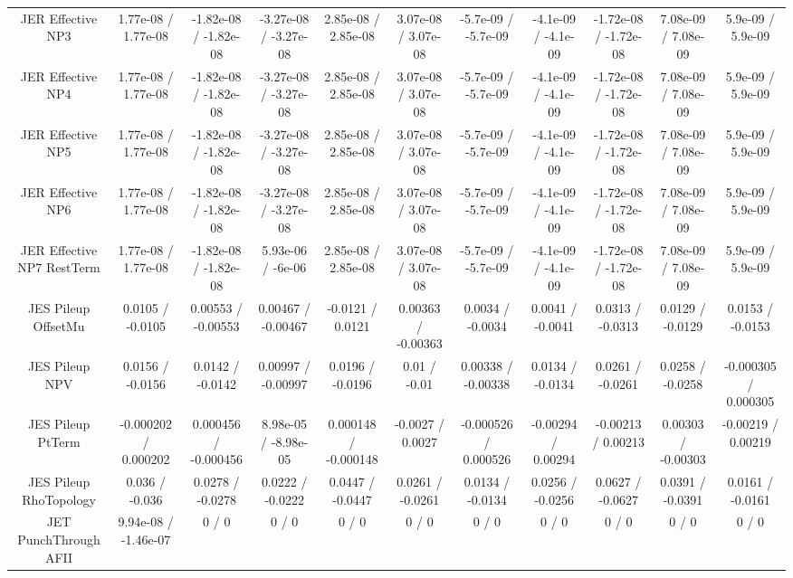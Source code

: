\begin{table}[htbp]
\begin{center}
\begin{tabular}{|c|c|c|c|c|c|c|c|c|c|c|}
  JER Effective NP3 & 1.77e-08 / 1.77e-08 & -1.82e-08 / -1.82e-08 & -3.27e-08 / -3.27e-08 & 2.85e-08 / 2.85e-08 & 3.07e-08 / 3.07e-08 & -5.7e-09 / -5.7e-09 & -4.1e-09 / -4.1e-09 & -1.72e-08 / -1.72e-08 & 7.08e-09 / 7.08e-09 & 5.9e-09 / 5.9e-09 \\ 
  JER Effective NP4 & 1.77e-08 / 1.77e-08 & -1.82e-08 / -1.82e-08 & -3.27e-08 / -3.27e-08 & 2.85e-08 / 2.85e-08 & 3.07e-08 / 3.07e-08 & -5.7e-09 / -5.7e-09 & -4.1e-09 / -4.1e-09 & -1.72e-08 / -1.72e-08 & 7.08e-09 / 7.08e-09 & 5.9e-09 / 5.9e-09 \\ 
  JER Effective NP5 & 1.77e-08 / 1.77e-08 & -1.82e-08 / -1.82e-08 & -3.27e-08 / -3.27e-08 & 2.85e-08 / 2.85e-08 & 3.07e-08 / 3.07e-08 & -5.7e-09 / -5.7e-09 & -4.1e-09 / -4.1e-09 & -1.72e-08 / -1.72e-08 & 7.08e-09 / 7.08e-09 & 5.9e-09 / 5.9e-09 \\ 
  JER Effective NP6 & 1.77e-08 / 1.77e-08 & -1.82e-08 / -1.82e-08 & -3.27e-08 / -3.27e-08 & 2.85e-08 / 2.85e-08 & 3.07e-08 / 3.07e-08 & -5.7e-09 / -5.7e-09 & -4.1e-09 / -4.1e-09 & -1.72e-08 / -1.72e-08 & 7.08e-09 / 7.08e-09 & 5.9e-09 / 5.9e-09 \\ 
  JER Effective NP7 RestTerm & 1.77e-08 / 1.77e-08 & -1.82e-08 / -1.82e-08 & 5.93e-06 / -6e-06 & 2.85e-08 / 2.85e-08 & 3.07e-08 / 3.07e-08 & -5.7e-09 / -5.7e-09 & -4.1e-09 / -4.1e-09 & -1.72e-08 / -1.72e-08 & 7.08e-09 / 7.08e-09 & 5.9e-09 / 5.9e-09 \\ 
  JES Pileup OffsetMu & 0.0105 / -0.0105 & 0.00553 / -0.00553 & 0.00467 / -0.00467 & -0.0121 / 0.0121 & 0.00363 / -0.00363 & 0.0034 / -0.0034 & 0.0041 / -0.0041 & 0.0313 / -0.0313 & 0.0129 / -0.0129 & 0.0153 / -0.0153 \\ 
  JES Pileup NPV & 0.0156 / -0.0156 & 0.0142 / -0.0142 & 0.00997 / -0.00997 & 0.0196 / -0.0196 & 0.01 / -0.01 & 0.00338 / -0.00338 & 0.0134 / -0.0134 & 0.0261 / -0.0261 & 0.0258 / -0.0258 & -0.000305 / 0.000305 \\ 
  JES Pileup PtTerm & -0.000202 / 0.000202 & 0.000456 / -0.000456 & 8.98e-05 / -8.98e-05 & 0.000148 / -0.000148 & -0.0027 / 0.0027 & -0.000526 / 0.000526 & -0.00294 / 0.00294 & -0.00213 / 0.00213 & 0.00303 / -0.00303 & -0.00219 / 0.00219 \\ 
  JES Pileup RhoTopology & 0.036 / -0.036 & 0.0278 / -0.0278 & 0.0222 / -0.0222 & 0.0447 / -0.0447 & 0.0261 / -0.0261 & 0.0134 / -0.0134 & 0.0256 / -0.0256 & 0.0627 / -0.0627 & 0.0391 / -0.0391 & 0.0161 / -0.0161 \\ 
  JET PunchThrough AFII & 9.94e-08 / -1.46e-07 & 0 / 0 & 0 / 0 & 0 / 0 & 0 / 0 & 0 / 0 & 0 / 0 & 0 / 0 & 0 / 0 & 0 / 0 \\ 

\end{tabular}
\end{center}
\end{table}
